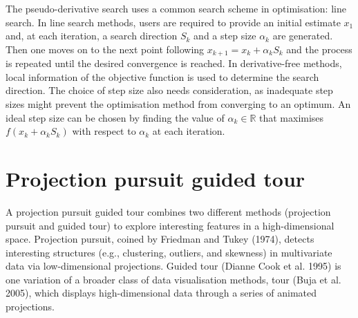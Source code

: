 The pseudo-derivative search uses a common search scheme in optimisation: line search. In line search methods, users are required to provide an initial estimate \(x_{1}\) and, at each iteration, a search direction \(S_k\) and a step size \(\alpha_k\) are generated. Then one moves on to the next point following \(x_{k+1} = x_k + \alpha_kS_k\) and the process is repeated until the desired convergence is reached. In derivative-free methods, local information of the objective function is used to determine the search direction. The choice of step size also needs consideration, as inadequate step sizes might prevent the optimisation method from converging to an optimum. An ideal step size can be chosen by finding the value of \(\alpha_k \in \mathbb{R}\) that maximises \(f(x_k + \alpha_kS_k)\) with respect to \(\alpha_k\) at each iteration.

\hypertarget{projection-pursuit-guided-tour}{%
\section{Projection pursuit guided tour}\label{projection-pursuit-guided-tour}}

A projection pursuit guided tour combines two different methods (projection pursuit and guided tour) to explore interesting features in a high-dimensional space. Projection pursuit, coined by Friedman and Tukey (1974), detects interesting structures (e.g., clustering, outliers, and skewness) in multivariate data via low-dimensional projections. Guided tour (Dianne Cook et al. 1995) is one variation of a broader class of data visualisation methods, tour (Buja et al. 2005), which displays high-dimensional data through a series of animated projections.

